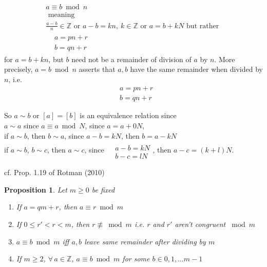 \documentclass[10pt]{amsart}
\newtheorem{proposition}{Proposition}
\begin{document}
\begin{multicols*}{2}
\begin{equation}
\boxed{ 
	\begin{gathered}
	a \equiv b \bmod{n} \\
	\text{ meaning } \\ 
	\frac{a-b}{n} \in \mathbb{Z} \text{ or }  a- b =kn, \  k\in \mathbb{Z} \text{ or } a  = b+kN \text{ but rather } \\
	\begin{aligned}
	& a = pn + r \\
	& b= qn +r
	\end{aligned}
	\end{gathered}	
}
\end{equation}
for $a= b+ kn$, but $b$ need not be a remainder of division of $a$ by $n$.  More precisely, $a= b\bmod{n}$ asserts that $a,b$ have the same remainder when divided by $n$, i.e. 
\[
\begin{aligned}
& a = pn + r \\ 
& b = qn + r
\end{aligned}
\]


So $a\sim b$ or $[a] = [b]$ is an equivalence relation since \\
$a\sim a$ since $a\equiv a \bmod{N}$, since $a=a+0N$, \\
if $a\sim b$, then $b\sim a$, since $a-b=kN$, then $b=a-kN$ \\
if $a\sim b$, $b\sim c$, then $a\sim c$, since $\begin{aligned} & \quad \\ 
	& a-b = kN \\
	& b-c = lN \end{aligned}$, then $a-c = (k+l)N$.  
	
	



cf. Prop. 1.19 of Rotman (2010) \cite{JRotman2010}  
\begin{proposition}
Let $m\geq 0$ be fixed 
\begin{enumerate}
	\item If $a=qm +r$, then $a \equiv r \bmod{m}$ 
	\item  If $0\leq r' <r <m$, then $r \not\equiv\bmod{m}$ i.e. $r$ and $r'$ aren't congruent $\bmod{m}$  
	\item $a \equiv b \bmod{m}$ iff $a,b$ leave same remainder after dividing by $m$  
	\item If $m\geq 2$, $\forall \, a \in \mathbb{Z}$, $a \equiv b \bmod{m}$ for some $b\in 0,1,\dots m-1$  
\end{enumerate}	
\end{proposition}


\end{multicols*}
\end{document}
